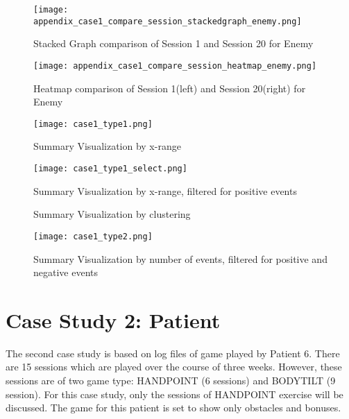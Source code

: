\begin{figure}
\centering
\texttt{[image: appendix\_case1\_compare\_session\_stackedgraph\_enemy.png]}
\caption{Stacked Graph comparison of Session 1 and Session 20 for Enemy}
\label{fig:app1_stacked_enemy}
\end{figure}

\begin{figure}
\centering
\texttt{[image: appendix\_case1\_compare\_session\_heatmap\_enemy.png]}
\caption{Heatmap comparison of Session 1(left) and Session 20(right) for Enemy}
\label{fig:app1_heatmap_enemy}
\end{figure}

\begin{figure}
\centering
\texttt{[image: case1\_type1.png]}
\caption{Summary Visualization by x-range}
\label{fig:case1_type1}
\end{figure}

\begin{figure}
\centering
\texttt{[image: case1\_type1\_select.png]}
\caption{Summary Visualization by x-range, filtered for positive events}
\label{fig:case1_type1_select}
\end{figure}

\begin{figure}%
    \centering
    \qquad
    \caption{Summary Visualization by clustering}%
    \label{fig:case1_clustered}%
\end{figure}

\begin{figure}
\centering
\texttt{[image: case1\_type2.png]}
\caption{Summary Visualization by number of events, filtered for positive and negative events}
\label{fig:case1_type2}
\end{figure}

\section{Case Study 2: Patient}
The second case study is based on log files of game played by Patient 6. There are 15 sessions which are played over the course of three weeks. However, these sessions are of two game type: HANDPOINT (6 sessions) and BODYTILT (9 session). For this case study, only the sessions of HANDPOINT exercise will be discussed. The game for this patient is set to show only obstacles and bonuses.

